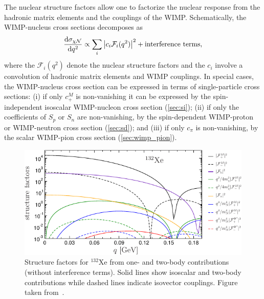 The nuclear structure factors allow one to factorize the nuclear response from the hadronic matrix elements and the couplings of the WIMP. Schematically, the WIMP-nucleus cross sections decomposes as
\begin{equation}
 \frac{{\rm d}\sigma_{\chi\mathcal{N}}}{{\rm d}q^2}\propto \sum_i \big|c_i \mathcal{F}_i(q^2)\big|^2 + {\rm interference\ terms},
\end{equation}
where the $\mathcal{F}_i(q^2)$ denote the nuclear structure factors and the $c_i$ involve a convolution of hadronic matrix elements and WIMP couplings. In special cases, the WIMP-nucleus cross section can be expressed in terms of single-particle cross sections: (i) if only $c^M_+$ is non-vanishing it can be expressed by the spin-independent isoscalar WIMP-nucleon cross section (\autoref{sec:si}); (ii) if only the coefficients of $S_p$ or $S_n$ are non-vanishing, by the spin-dependent WIMP-proton or WIMP-neutron cross section (\autoref{sec:sd}); and (iii) if only $c_\pi$ is non-vanishing, by the scalar WIMP-pion cross section (\autoref{sec:wimp_pion}).

\begin{figure}[!htbp] 
\centering
	\includegraphics[width=\columnwidth,clip]{fig_structure_factors_xe132.pdf}
	\caption{Structure factors for $^{132}$Xe from one- and two-body contributions (without interference terms). Solid lines show isoscalar and two-body contributions while dashed lines indicate isovector couplings. Figure taken from~\cite{Hoferichter:2018acd}.}
	\label{fig:structure_factors_xe132}
\end{figure}

